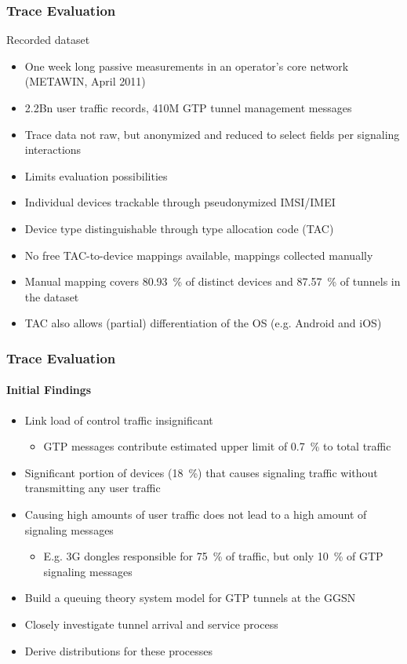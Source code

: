 \documentclass{beamer}
\begin{document}
\begin{frame}
	\frametitle{Trace Evaluation}
	Recorded dataset
	\begin{itemize}
		\item One week long passive measurements in an operator's core network (METAWIN, April 2011)
		\item 2.2Bn user traffic records, 410M GTP tunnel management messages
		\item Trace data not raw, but anonymized and reduced to select fields per signaling interactions
		\item Limits evaluation possibilities 
	\end{itemize}

	\begin{itemize}[<2->]
		\item Individual devices trackable through pseudonymized IMSI/IMEI
		\item Device type distinguishable through type allocation code (TAC)
		\item No free TAC-to-device mappings available, mappings collected manually
		\item Manual mapping covers \SI{80.93}{\percent} of distinct devices and \SI{87.57}{\percent} of tunnels in the dataset
		\item TAC also allows (partial) differentiation of the OS (e.g. Android and iOS)
	\end{itemize}
\end{frame}


\begin{frame}
	\frametitle{Trace Evaluation}
	\framesubtitle{Initial Findings}

	\begin{itemize}
		\item Link load of control traffic insignificant
			\begin{itemize}
				\item GTP messages contribute estimated upper limit of \SI{0.7}{\percent} to total traffic
			\end{itemize}
		\item Significant portion of devices (\SI{18}{\percent}) that causes signaling traffic without transmitting any user traffic
		\item Causing high amounts of user traffic does not lead to a high amount of signaling messages
			\begin{itemize}
				\item E.g. 3G dongles responsible for \SI{75}{\percent} of traffic, but only \SI{10}{\percent} of GTP signaling messages
			\end{itemize}
	\end{itemize}

	\begin{itemize}[<2->]
		\item Build a queuing theory system model for GTP tunnels at the GGSN
		\item Closely investigate tunnel arrival and service process
		\item Derive distributions for these processes
	\end{itemize}
\end{frame}
\end{document}
